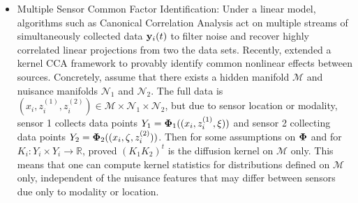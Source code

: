\begin{itemize}
\item Multiple Sensor Common Factor Identification: 
Under a linear model, algorithms such as Canonical Correlation Analysis \cite{hardoon2004canonical} act on multiple streams of simultaneously collected data $\mathbf{y}_i(t)$ to filter noise and recover highly correlated linear projections from two the data sets.
Recently, \cite{lederman2018learning} extended a kernel CCA framework to provably identify common nonlinear effects between sources.
Concretely, assume that there exists a hidden manifold $\mathcal{M}$ and nuisance manifolds $\mathcal{N}_1$ and $\mathcal{N}_2$.
The full data is $(x_i,z_i^{(1)}, z_i^{(2)})\in \mathcal{M}\times \mathcal{N}_1\times \mathcal{N}_2$, but due to sensor location or modality, sensor 1 collects data points $Y_1 = \mathbf{\Phi}_1((x_i,z_i^{(1)}, \xi))$ and sensor 2 collecting data points $Y_2 = \mathbf{\Phi}_2((x_i,\zeta,z_i^{(2)}))$.  Then for some assumptions on $\mathbf{\Phi}$ and for $K_i: Y_i\times Y_i \rightarrow \mathbb{R}$,
\cite{talmon2018latent} proved $(K_1 K_2)^t$ is the diffusion kernel on $\mathcal{M}$ only.   This means that one can compute kernel statistics for distributions defined on $\mathcal{M}$ only, independent of the nuisance features that may differ between sensors due only to modality or location.



\end{itemize}
